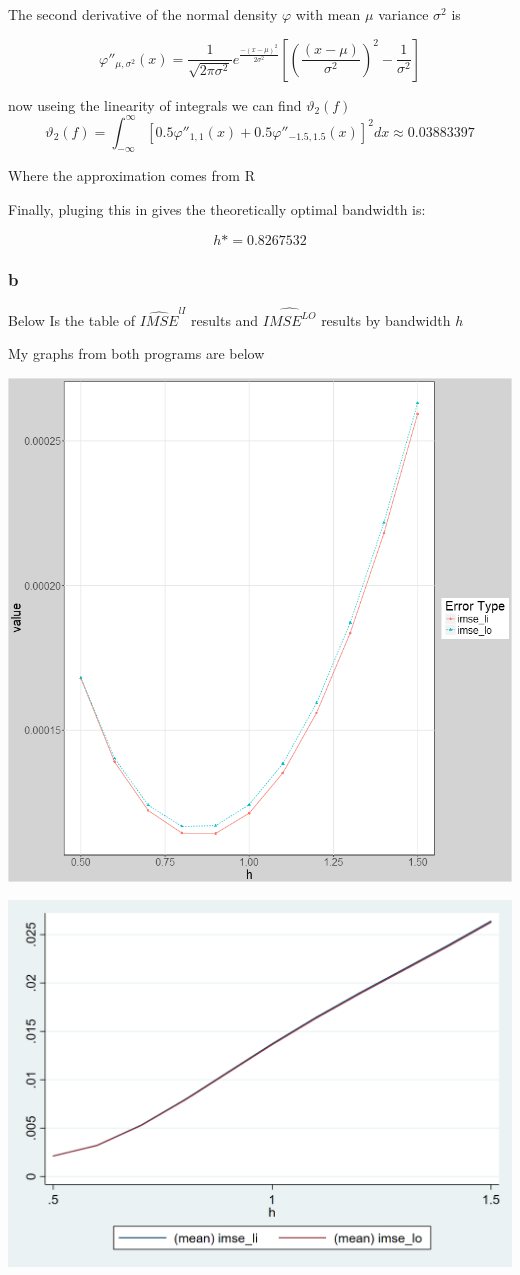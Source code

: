 \documentclass[11pt]{article}
\begin{document}
The second derivative of the normal density $\varphi$ with mean $\mu$ variance $\sigma^2$ is 

$$\varphi''_{\mu, \sigma^2}(x) = \frac{1}{\sqrt{2 \pi \sigma^2 }}e^{\frac{-(x-\mu)^2}{2\sigma^2}} \left[ \left( \frac{(x - \mu)}{\sigma^2} \right)^2 - \frac{1}{\sigma^2} \right]
$$

now useing the linearity of integrals we can find $\vartheta_{2}(f)$
$$ \vartheta_{2}(f) = \int_{-\infty}^{\infty} [0.5 \varphi''_{1,1}(x) + 0.5 \varphi''_{-1.5, 1.5}(x)]^2dx \approx 0.03883397
$$

Where the approximation comes from R 

Finally, pluging this in gives the theoretically optimal bandwidth is: 

$$h* = 0.8267532
$$

\subsubsection{b}

Below Is the table of $\widehat{IMSE}^{lI}$ results and $\widehat{IMSE^{LO}}$ results by bandwidth $h$ 

\begin{center}
	
\end{center}

My graphs from both programs are below 

\begin{center}
		\includegraphics[width=.6\linewidth]{plot_1_3_b.png}

\end{center}
\begin{center}
	\includegraphics[width=.6\linewidth]{stata_plot_1_3_b.png}
	
\end{center}
\end{document}
